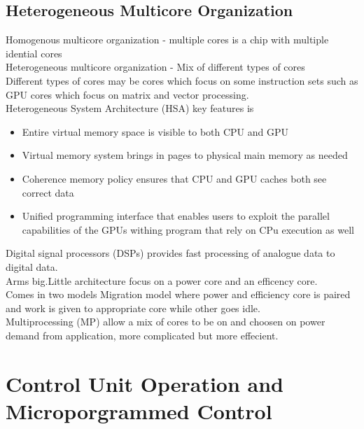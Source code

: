 \documentclass[12pt, a4paper]{article}
\begin{document}
		\subsection{Heterogeneous Multicore Organization}
			Homogenous multicore organization - multiple cores is a chip with multiple idential cores\\
			Heterogeneous multicore organization - Mix of different types of cores\\
			Different types of cores may be cores which focus on some instruction sets such as GPU cores which focus on matrix and vector processing.\\
			Heterogeneous System Architecture (HSA) key features is
			\begin{itemize}
				\item Entire virtual memory space is visible to both CPU and GPU
				\item Virtual memory system brings in pages to physical main memory as needed
				\item Coherence memory policy ensures that CPU and GPU caches both see correct data
				\item Unified programming interface that enables users to exploit the parallel capabilities of the GPUs withing program that rely on CPu execution as well
			\end{itemize}
			Digital signal processors (DSPs) provides fast processing of analogue data to digital data.\\
			Arms big.Little architecture focus on a power core and an efficency core.\\
			Comes in two models Migration model where power and efficiency core is paired and work is given to appropriate core while other goes idle.\\
			Multiprocessing (MP) allow a mix of cores to be on and choosen on power demand from application, more complicated but more effecient.\\
	\section{Control Unit Operation and Microporgrammed Control}
\end{document}

